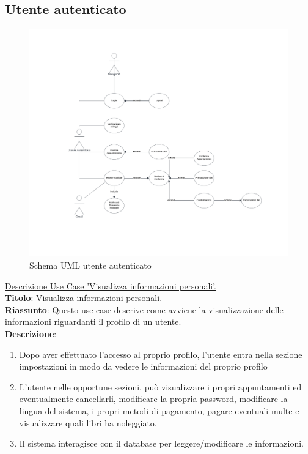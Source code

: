 \documentclass{article}
\begin{document}
    \subsection{Utente autenticato}
\begin{figure}[H]
    \centering
    \includegraphics[width=130mm]{D2/Images/UT_autenticato2.png}
    \caption{Schema UML utente autenticato}
\end{figure}

    \noindent\underline{Descrizione Use Case 'Visualizza informazioni personali'.}\\
    \textbf{Titolo}: Visualizza informazioni personali.\\
    \textbf{Riassunto}: Questo use case descrive come avviene la visualizzazione delle informazioni riguardanti il profilo di un utente.\\
    \textbf{Descrizione}: 
        \begin{enumerate}
        \item Dopo aver effettuato l'accesso al proprio profilo, l'utente entra nella sezione impostazioni in modo da vedere le informazioni del proprio profilo
        \item L'utente nelle opportune sezioni, può visualizzare i propri appuntamenti ed eventualmente cancellarli, modificare la propria password, modificare la lingua del sistema, i propri metodi di pagamento, pagare eventuali multe e visualizzare quali libri ha noleggiato.
        \item Il sistema interagisce con il database per leggere/modificare le informazioni.
    \end{enumerate}
\end{document}
